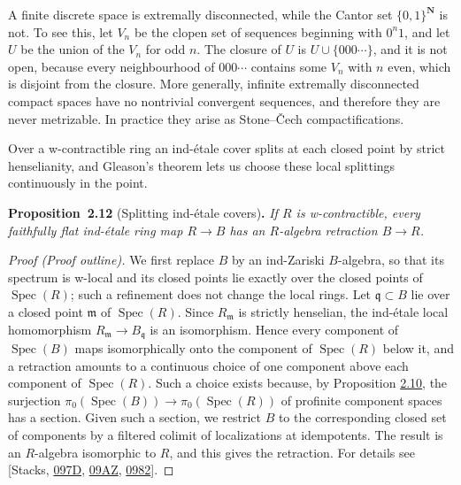 \documentclass[11pt]{article}
\newenvironment{bpstatement}[2]{\par\addvspace{0.6\baselineskip}\noindent\textbf{#1}#2\textbf{.}\enspace\ignorespaces}
  {\par\addvspace{0.4\baselineskip}}
\newenvironment{bpstatementit}[2]{\begin{bpstatement}{#1}{#2}\itshape\ignorespaces}{\end{bpstatement}}
\begin{document}
\label{bp35}%
A finite discrete space is extremally disconnected, while the Cantor set \(\{0,1\}^{\mathbf N}\) is not. To see this, let \(V_n\) be the clopen set of sequences beginning with \(0^n1\), and let \(U\) be the union of the \(V_n\) for odd \(n\). The closure of \(U\) is \(U\cup\{000\cdots\}\), and it is not open, because every neighbourhood of \(000\cdots\) contains some \(V_n\) with \(n\) even, which is disjoint from the closure. More generally, infinite extremally disconnected compact spaces have no nontrivial convergent sequences, and therefore they are never metrizable. In practice they arise as Stone–Čech compactifications.

Over a w-contractible ring an ind-étale cover splits at each closed point by strict henselianity, and Gleason's theorem lets us choose these local splittings continuously in the point.

\label{bp36}%
\begin{bpstatementit}{Proposition~2.12}{ (Splitting ind-étale covers)}
If \(R\) is w-contractible, every faithfully flat ind-étale ring map \(R\to B\) has an \(R\)-algebra retraction \(B\to R\).
\end{bpstatementit}

\begin{proof}[{Proof (Proof outline)}]\label{bp37}%
We first replace \(B\) by an ind-Zariski \(B\)-algebra, so that its spectrum is w-local and its closed points lie exactly over the closed points of \(\operatorname{Spec}(R)\); such a refinement does not change the local rings. Let \(\mathfrak q\subset B\) lie over a closed point \(\mathfrak m\) of \(\operatorname{Spec}(R)\). Since \(R_{\mathfrak m}\) is strictly henselian, the ind-étale local homomorphism \(R_{\mathfrak m}\to B_{\mathfrak q}\) is an isomorphism. Hence every component of \(\operatorname{Spec}(B)\) maps isomorphically onto the component of \(\operatorname{Spec}(R)\) below it, and a retraction amounts to a continuous choice of one component above each component of \(\operatorname{Spec}(R)\). Such a choice exists because, by Proposition \hyperref[bp30]{2.10}, the surjection \(\pi_0(\operatorname{Spec}(B))\to\pi_0(\operatorname{Spec}(R))\) of profinite component spaces has a section. Given such a section, we restrict \(B\) to the corresponding closed set of components by a filtered colimit of localizations at idempotents. The result is an \(R\)-algebra isomorphic to \(R\), and this gives the retraction. For details see [Stacks, \href{https://stacks.math.columbia.edu/tag/097D}{097D}, \href{https://stacks.math.columbia.edu/tag/09AZ}{09AZ}, \href{https://stacks.math.columbia.edu/tag/0982}{0982}].
\end{proof}
\end{document}
